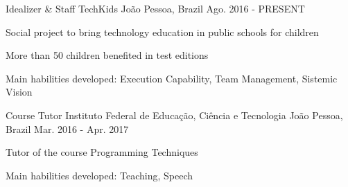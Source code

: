 \begin{cventries}
%

  \cventry
    {Idealizer \& Staff}
    {TechKids}
    {João Pessoa, Brazil}
    {Ago. 2016 - PRESENT}
    {
      \begin{cvitems}
        \item {Social project to bring technology education in public schools for children}
        \item {More than 50 children benefited in test editions}
        \item {Main habilities developed: Execution Capability, Team Management, Sistemic Vision}
      \end{cvitems}
    }

  \cventry
    {Course Tutor} %
    {Instituto Federal de Educação, Ciência e Tecnologia} %
    {João Pessoa, Brazil} %
    {Mar. 2016 - Apr. 2017} %
    {
      \begin{cvitems} %
        \item {Tutor of the course Programming Techniques}
        \item {Main habilities developed: Teaching, Speech}
      \end{cvitems}
    }


\end{cventries}
